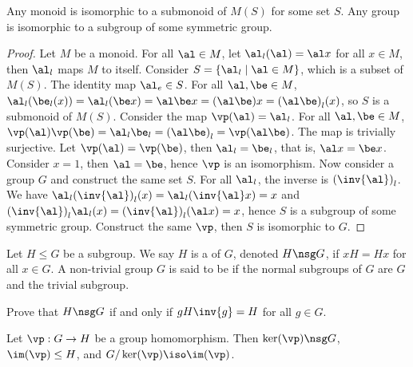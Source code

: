 \documentclass[10pt]{article}
\begin{document}
\begin{theorem}
    Any monoid is isomorphic to a submonoid of $M(S)$ for some set $S$. Any group is isomorphic to a subgroup of some symmetric group.
\end{theorem}
\begin{proof}
    Let $M$ be a monoid. For all $\al\in M$, let ${\al}_{l}(\al)=\al x$ for all $x\in M$, then ${\al}_{l}$ maps $M$ to itself. Consider $S=\{{\al}_{l}\mid\al\in M\}$, which is a subset of $M(S)$. The identity map ${\al}_{e}\in S$. For all $\al,\be\in M$, ${\al}_{l}({\be}_{l}(x))={\al}_{l}(\be x)=\al\be x=(\al\be)x={(\al\be)}_{l}(x)$, so $S$ is a submonoid of $M(S)$. Consider the map $\vp(\al)={\al}_{l}$. For all $\al,\be\in M$, $\vp(\al)\vp(\be)={\al}_{l}{\be}_{l}={(\al\be)}_{l}=\vp(\al\be)$. The map is trivially surjective. Let $\vp(\al)=\vp(\be)$, then ${\al}_{l}={\be}_{l}$, that is, $\al x=\be x$. Consider $x=1$, then $\al=\be$, hence $\vp$ is an isomorphism. Now consider a group $G$ and construct the same set $S$. For all ${\al}_{l}$, the inverse is ${(\inv{\al})}_{l}$. We have ${\al}_{l}{(\inv{\al})}_{l}(x)={\al}_{l}(\inv{\al}x)=x$ and ${(\inv{\al})}_{l}{\al}_{l}(x)={(\inv{\al})}_{l}(\al x)=x$, hence $S$ is a subgroup of some symmetric group. Construct the same $\vp$, then $S$ is isomorphic to $G$.
\end{proof}
\begin{definition}
    Let $H\le G$ be a subgroup. We say $H$ is a  of $G$, denoted $H\nsg G$, if $xH=Hx$ for all $x\in G$. A non-trivial group $G$ is said to be  if the normal subgroups of $G$ are $G$ and the trivial subgroup.
\end{definition}
\begin{problem}
    Prove that $H\nsg G$ if and only if $gH\inv{g}=H$ for all $g\in G$.
\end{problem}
\begin{theorem}
    Let $\vp:G\to H$ be a group homomorphism. Then $\ker(\vp)\nsg G$, $\im(\vp)\le H$, and $G/\ker(\vp)\iso\im(\vp)$.
\end{theorem}
\begin{center}
\end{center}
\end{document}

